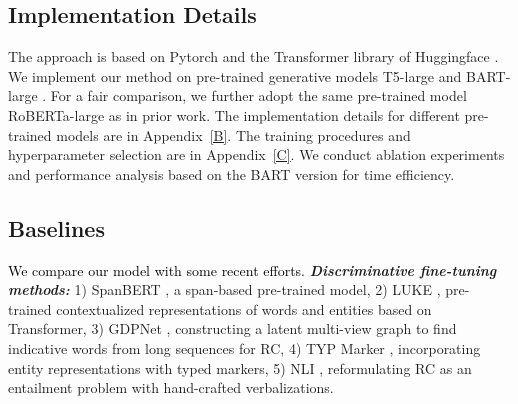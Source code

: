 \documentclass[11pt]{article}
\begin{document}
\subsection{Implementation Details}
The approach is  based on Pytorch \cite{DBLP:conf/nips/PaszkeGMLBCKLGA19} and the Transformer library of Huggingface \cite{wolf-etal-2020-transformers}. We implement our method on pre-trained generative models T5-large \cite{DBLP:journals/jmlr/RaffelSRLNMZLL20} and BART-large \cite{lewis-etal-2020-bart}. 
For a fair comparison, we further adopt the same pre-trained model RoBERTa-large \cite{DBLP:journals/corr/abs-1907-11692} as in prior work. The implementation details for different pre-trained models are in Appendix~\ref{B}. The training procedures and hyperparameter selection are in Appendix~\ref{C}. We conduct ablation experiments and performance analysis based on the BART version for time efficiency.

\begin{comment}
\begin{table}
	\centering
	\begin{tabular}{lll}
		\hline
		Parameter & BART&T5 \\
		\hline
		batch size & 16 & 4\\
		learning rate & 3e-5 & 3e-5 \\
		max input len & 512 & 512 \\
		max generate len &10&15\\
		prompt len &3&5\\
		epoch &10&10\\\hline
	\end{tabular}
	\caption{Hyper-parameters of our approach.}
	\label{hyper-parameters}
\end{table}
\end{comment}

\subsection{Baselines}

\textcolor{black}{We compare our model with some recent efforts.}
\noindent\textbf{ \textit{Discriminative fine-tuning methods:}} 1) SpanBERT \cite{joshi-etal-2020-spanbert}, a span-based pre-trained model, 2) LUKE \cite{yamada-etal-2020-luke}, pre-trained contextualized representations of words and entities based on Transformer, 3) GDPNet \cite{DBLP:conf/aaai/XueSZC21}, 
constructing a latent multi-view graph to find indicative words from long sequences for RC, 4) TYP Marker \cite{DBLP:journals/corr/abs-2102-01373}, incorporating entity representations with typed markers, 5) NLI \cite{DBLP:conf/emnlp/SainzLLBA21}, reformulating RC as an entailment problem with hand-crafted verbalizations. 
\end{document}
